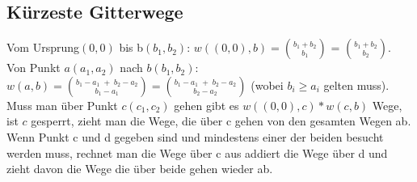 \documentclass[11pt]{article}
\begin{document}
\subsection{K{\"u}rzeste Gitterwege}
Vom Ursprung$(0,0)$ bis b$(b_1,b_2)$: $w((0,0),b) = {{b_1+b_2} \choose {b_1}}$ = ${{b_1+b_2} \choose {b_2}}$.\\ Von Punkt $a(a_1,a_2)$ nach $b(b_1,b_2)$: $w(a,b) = {{b_1-a_1\;+\;b_2-a_2} \choose {b_1-a_1}} = {{b_1-a_1\;+\;b_2-a_2} \choose {b_2-a_2}}$ (wobei $b_i \geq a_i$ gelten muss).\\Muss man {\"u}ber Punkt $c(c_1,c_2)$ gehen gibt es $w((0,0),c) * w(c,b)$ Wege, ist $c$ gesperrt, zieht man die Wege, die {\"u}ber c gehen von den gesamten Wegen ab.\\ Wenn Punkt c und d gegeben sind und mindestens einer der beiden besucht werden muss, rechnet man die Wege {\"u}ber c aus addiert die Wege {\"u}ber d und zieht davon die Wege die {\"u}ber beide gehen wieder ab.
\end{document}
